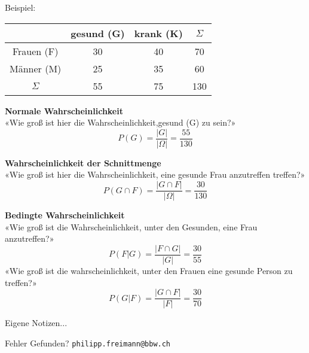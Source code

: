 \begin{multicols}{2}
Beispiel:

\begin{tabular}{c|c|c|c}
           & gesund (G)& krank (K)& $\Sigma$ \\\hline
Frauen (F) &        30 &       40 &       70 \\\hline
Männer (M) &        25 &       35 &       60 \\\hline
$\Sigma$   &        55 &       75 &      130 \\\hline
 \end{tabular}

\textbf{Normale Wahrscheinlichkeit}\\
«Wie groß ist hier die Wahrscheinlichkeit,gesund (G) zu sein?»
$$P(G) = \frac{|G|}{|\Omega|} = \frac{55}{130}$$

\textbf{Wahrscheinlichkeit der Schnittmenge}\\
«Wie groß ist hier die Wahrscheinlichkeit, eine gesunde Frau anzutreffen treffen?»
$$P(G\cap F) = \frac{|G\cap F|}{|\Omega|} = \frac{30}{130}$$

\textbf{Bedingte Wahrscheinlichkeit}\\
«Wie groß ist die Wahrscheinlichkeit, unter den Gesunden, eine Frau anzutreffen?»
$$P(F | G) = \frac{|F\cap G|}{|G|} = \frac{30}{55}$$
«Wie groß ist die wahrscheinlichkeit, unter den Frauen eine gesunde Person zu treffen?»
$$P(G | F) = \frac{|G \cap F|}{|F|} = \frac{30}{70}$$


\end{multicols}


\newpage
Eigene Notizen...

\newpage
{}

\vspace{5mm}

Fehler Gefunden? \texttt{philipp.freimann@bbw.ch}




